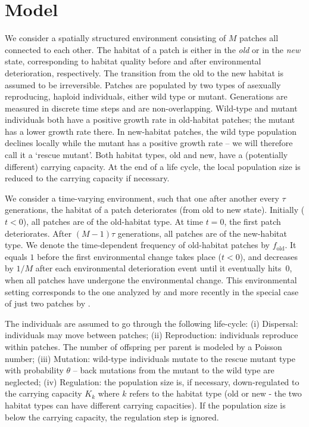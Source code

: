 \documentclass[a4paper,11pt]{article}
\newcommand{\chg}[1]{\textcolor{change}{#1}}
\begin{document}
\section*{Model}
We consider a spatially structured environment consisting of $M$ patches all connected to each other. The habitat of a patch is either in the \textit{old} or in the \textit{new} state, corresponding to habitat quality before and after environmental deterioration, respectively. The transition from the old to the new habitat is assumed to be irreversible. Patches are populated by two types of asexually reproducing, haploid individuals, either wild type or mutant. Generations are measured in discrete time steps and are non-overlapping. \chg{Wild-type and mutant individuals both have a positive growth rate} in old-habitat patches; the mutant has a lower growth rate there. In new-habitat patches, the wild type population declines locally while the mutant has a positive growth rate -- we will therefore call it a `rescue mutant'. \chg{Both habitat types, old and new, have a (potentially different) carrying capacity. At the end of a life cycle, the local population size is reduced to the carrying capacity if necessary.}

We consider a time-varying environment, such that one after \chg{another} every $\tau$ generations, the habitat of a patch deteriorates (from old to new state). Initially ($t<0$), all patches are of the old-habitat type. At time $t=0$, the first patch deteriorates. After $(M-1)\tau$ generations, all patches are of the new-habitat type. We denote the time-dependent frequency of old-habitat patches by $f_{\text{old}}$. It equals $1$ before the first environmental change takes place ($t<0$), and decreases by $1/M$ after each environmental deterioration event until it eventually hits~$0$, when all patches have undergone the environmental change. This environmental setting corresponds to the one analyzed by \citet{uecker_2014} and more recently in the special case of just two patches by \citet{tomasini_2019}.

The individuals are assumed to go through the following life-cycle: (i) Dispersal: individuals may move between patches; (ii) Reproduction: individuals reproduce within patches. \chg{The number of offspring per parent is modeled by a Poisson number}; (iii) Mutation: wild-type individuals mutate to the rescue mutant type with probability $\theta$ -- back mutations from the mutant to the wild type are neglected; (iv) Regulation: the population size is, \chg{if necessary, down-regulated to the carrying capacity $K_k$ where $k$ refers to the habitat type (old or new - the two habitat types can have different carrying capacities)}. If the population size is below the carrying capacity, the regulation step is ignored. 
\end{document}
